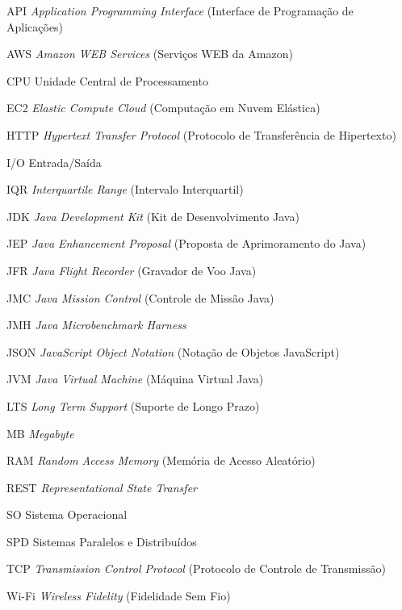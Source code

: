 \documentclass[12pt, openright, oneside, a4paper, english,	french,	spanish, brazil	]{abntex2}
\begin{document}
    \begin{siglas}
        \item[API]     \textit{Application Programming Interface} (Interface de Programação de Aplicações)
        \item[AWS]     \textit{Amazon WEB Services} (Serviços WEB da Amazon)
        \item[CPU]     Unidade Central de Processamento
        \item[EC2]     \textit{Elastic Compute Cloud} (Computação em Nuvem Elástica)
        \item[HTTP]    \textit{Hypertext Transfer Protocol} (Protocolo de Transferência de Hipertexto)
        \item[I/O]     Entrada/Saída
        \item[IQR]     \textit{Interquartile Range} (Intervalo Interquartil)
        \item[JDK]     \textit{Java Development Kit} (Kit de Desenvolvimento Java)
        \item[JEP]     \textit{Java Enhancement Proposal} (Proposta de Aprimoramento do Java)
        \item[JFR]     \textit{Java Flight Recorder} (Gravador de Voo Java)
        \item[JMC]     \textit{Java Mission Control} (Controle de Missão Java)
        \item[JMH]     \textit{Java Microbenchmark Harness}
        \item[JSON]    \textit{JavaScript Object Notation} (Notação de Objetos JavaScript)
        \item[JVM]     \textit{Java Virtual Machine} (Máquina Virtual Java)
        \item[LTS]     \textit{Long Term Support} (Suporte de Longo Prazo)
        \item[MB]      \textit{Megabyte}
        \item[RAM]     \textit{Random Access Memory} (Memória de Acesso Aleatório)
        \item[REST]    \textit{Representational State Transfer}
        \item[SO]      Sistema Operacional
        \item[SPD]     Sistemas Paralelos e Distribuídos
        \item[TCP]     \textit{Transmission Control Protocol} (Protocolo de Controle de Transmissão)
        \item[Wi-Fi]   \textit{Wireless Fidelity} (Fidelidade Sem Fio)
    \end{siglas}
\end{document}
